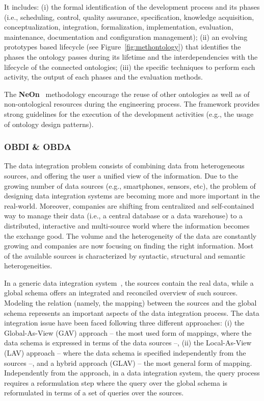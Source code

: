 It includes: (i) the formal identification of the development process and its phases (i.e., scheduling, control, quality assurance, specification, knowledge acquisition, conceptualization, integration, formalization, implementation, evaluation, maintenance, documentation and configuration management); (ii) an evolving prototypes based lifecycle (see Figure~\ref{fig:methontology}) that identifies the phases the ontology passes during its lifetime and the interdependencies with the lifecycle of the connected ontologies; (iii) the specific techniques to perform each activity, the output of each phases and the evaluation methods.

The \textbf{NeOn}~\cite{DBLP:phd/dnb/Suarez-Figueroa12} methodology encourage the reuse of other ontologies as well as of non-ontological resources during the engineering process. The framework provides strong guidelines for the execution of the development activities (e.g., the usage of ontology design patterns). 

\subsubsection{OBDI \& OBDA}\label{sec:obdi-obda}
The data integration problem consists of combining data from heterogeneous sources, and offering the user a unified view of the information. Due to the growing number of data sources (e.g., smartphones, sensors, etc), the  problem of designing data integration systems are becoming more and more important in the real-world.
Moreover, companies are shifting from centralized and self-contained way to manage their data (i.e., a central database or a data warehouse) to a distributed, interactive and multi-source world where the information becomes the exchange good. The volume and the heterogeneity of the data are constantly growing and companies are now focusing on finding the right information.
Most of the available sources is characterized by syntactic, structural and semantic heterogeneities.

In a generic data integration system~\cite{LenzeriniOBDI}, the sources contain the real data, while a global schema offers an integrated and reconciled overview of such sources. Modeling the relation (namely, the mapping) between the sources and the global schema represents an important aspects of the data integration process.
The data integration issue have been faced following three different approaches: (i) the Global-As-View (GAV) approach -- the most used form of mappings, where the data schema is expressed in terms of the data sources --, (ii) the Local-As-View (LAV) approach -- where the data schema is specified independently from the sources --, and a hybrid approach (GLAV) -- the most general form of mapping.
Independently from the approach, in a data integration system, the query process requires a reformulation step where the query over the global schema is reformulated in terms of a set of queries over the sources.

